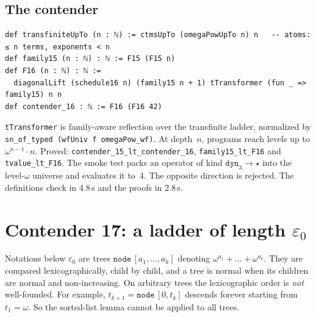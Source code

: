 \documentclass[11pt]{article}
\theoremstyle{definition}
\theoremstyle{remark}
\newcommand{\lean}[1]{\texttt{#1}}
\begin{document}
\subsection{The contender}
\begin{lstlisting}
def transfiniteUpTo (n : ℕ) := ctmsUpTo (omegaPowUpTo n) n   -- atoms: ≤ n terms, exponents < n
def family15 (n : ℕ) : ℕ := F15 (F15 n)
def F16 (n : ℕ) : ℕ :=
  diagonalLift (schedule16 n) (family15 n + 1) tTransformer (fun _ => family15) n n
def contender_16 : ℕ := F16 (F16 42)
\end{lstlisting}
\lean{tTransformer} is family-aware reflection over the transfinite ladder,
normalized by \lean{sn\_of\_typed (wfUniv f omegaPow\_wf)}. At depth~$n$,
programs reach levels up to $\omega^{n-1}\cdot n$. Proved:
\lean{contender\_15\_lt\_\allowbreak contender\_16}, \lean{family15\_lt\_F16} and
\lean{tvalue\_lt\_F16}. The smoke test packs an operator of kind
$\mathtt{dyn}_3\to\star$ into the level-$\omega$ universe and evaluates it to~4.
The opposite direction is rejected. The definitions check in 4.8\,s and the
proofs in 2.8\,s.

\section{Contender 17: a ladder of length \texorpdfstring{$\varepsilon_0$}{epsilon0}}

Notations below $\varepsilon_0$ are trees $\mathtt{node}\,[a_1,\dots,a_k]$
denoting $\omega^{a_1}+\dots+\omega^{a_k}$. They are compared
lexicographically, child by child, and a tree is normal when its children are
normal and non-increasing. On arbitrary trees the lexicographic order is
\emph{not} well-founded. For example, $t_{k+1}=\mathtt{node}\,[0, t_k]$
descends forever starting from $t_1=\omega$. So the sorted-list lemma cannot be
applied to all trees.
\end{document}
